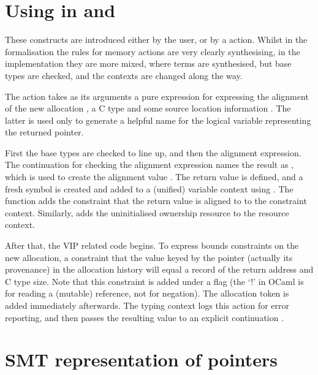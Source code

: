 \section{Using  in  and }

These constructs are introduced either by the user, or by a 
action. Whilst in the formalisation the rules for memory actions are very
clearly synthesising, in the implementation they are more mixed, where terms
are synthesised, but base types are checked, and the contexts are changed along
the way.

The  action takes as its arguments a pure expression for expressing
the alignment of the new allocation , a C type  and some
source location information . The latter is used only to generate
a helpful name for the logical variable representing the returned pointer.

First the base types are checked to line up, and then the alignment expression.
The continuation for checking the alignment expression names the result as
, which is used to create the alignment value
. The return value  is defined, and a
fresh symbol is created  and added to a (unified) variable
context using . The function  adds the
constraint that the return value  is aligned to
 to the constraint context. Similarly, 
adds the uninitialised ownership resource to the resource context.


After that, the VIP related code begins. To express bounds constraints on the
new allocation, a constraint that the value keyed by the pointer (actually its
provenance) in the allocation history will equal a record of the return address
and C type size. Note that this constraint is added under a flag
 (the `!' in OCaml is for reading a (mutable) reference,
not for negation). The allocation token is added immediately afterwards. The
typing context logs this action for error reporting, and then passes the
resulting value to an explicit continuation .


\section{SMT representation of pointers}

